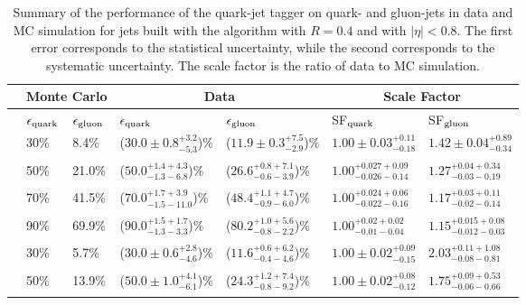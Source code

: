 \begin{table}[htbp]
\caption{
Summary of the performance of the quark-jet tagger on quark- and gluon-jets in data and \Pythia MC simulation for jets built with the \antikt algorithm with $R=0.4$ and with $|\eta|<0.8$. 
The first error corresponds to the statistical uncertainty, while the second corresponds to the systematic uncertainty.
The scale factor is the ratio of data to MC simulation. 
\label{tab:perfSummary}}
\begin{center}
\begin{tabular}{|c|l|l|l|l|l|l|}
\hline
& \multicolumn{2}{|c|}{Monte Carlo} & \multicolumn{2}{|c|}{Data} & \multicolumn{2}{|c|}{Scale Factor} \\ 
\hline
& $\epsilon_{\rm quark}$ & $\epsilon_{\rm gluon}$ & $\epsilon_{\rm quark}$ & $\epsilon_{\rm gluon}$ & SF$_{\rm quark}$ & SF$_{\rm gluon}$ \\
\hline\noalign{\smallskip}
\multirow{4}{*}{\begin{sideways}$\pt=60$--$80 \GeV$\end{sideways}} 
& 30\% &  8.4\% &  ($30.0\pm0.8^{+3.2}_{-5.3}$)\%    &  ($11.9\pm0.3^{+7.5}_{-2.9}$)\%    &  $1.00\pm0.03^{+0.11}_{-0.18}$ & $1.42\pm0.04^{+0.89}_{-0.34}$ \\&&&&&&\\
& 50\% & 21.0\% &  ($50.0^{+1.4+4.3}_{-1.3-6.8}$)\%  &  ($26.6^{+0.8+7.1}_{-0.6-3.9}$)\%  &  $1.00^{+0.027+0.09}_{-0.026-0.14}$ & $1.27^{+0.04+0.34}_{-0.03-0.19}$ \\&&&&&&\\
& 70\% & 41.5\% &  ($70.0^{+1.7+3.9}_{-1.5-11.0}$)\%  &  ($48.4^{+1.1+4.7}_{-0.9-6.0}$)\%  &  $1.00^{+0.024+0.06}_{-0.022-0.16}$ & $1.17^{+0.03+0.11}_{-0.02-0.14}$ \\&&&&&&\\
& 90\% & 69.9\% &  ($90.0^{+1.5+1.7}_{-1.3-3.3}$)\%  &  ($80.2^{+1.0+5.6}_{-0.8-2.2}$)\%   &  $1.00^{+0.02+0.02}_{-0.01-0.04}$ & $1.15^{+0.015+0.08}_{-0.012-0.03}$ \\&&&&&&\\
\hline\noalign{\smallskip}
\multirow{4}{*}{\begin{sideways}\centering$\pt=110$--$160 \GeV$\end{sideways}} 
& 30\% &  5.7\% &  ($30.0\pm0.6^{+2.8}_{-4.6}$)\%  & ($11.6^{+0.6+6.2}_{-0.4-4.6}$)\%   & $1.00\pm0.02^{+0.09}_{-0.15}$ & $2.03^{+0.11+1.08}_{-0.08-0.81}$ \\ &&&&&&\\
& 50\% & 13.9\% &  ($50.0\pm1.0^{+4.1}_{-6.1}$)\%  & ($24.3^{+1.2+7.4}_{-0.8-9.2}$)\%   & $1.00\pm0.02^{+0.08}_{-0.12}$ & $1.75^{+0.09+0.53}_{-0.06-0.66}$ \\ &&&&&&\\

\end{tabular}
\end{center}
\end{table}
